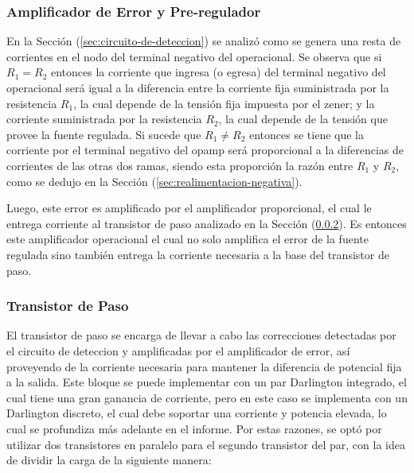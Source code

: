 \subsubsection{Amplificador de Error y Pre-regulador}

En la Sección (\ref{sec:circuito-de-deteccion}) se analizó como se genera una resta de corrientes en el nodo del terminal negativo del operacional. Se observa que si $R_1 = R_2$ entonces la corriente que ingresa (o egresa) del terminal negativo del operacional será igual a la diferencia entre la corriente fija suministrada por la resistencia $R_1$, la cual depende de la tensión fija impuesta por el zener; y la corriente suministrada por la resistencia $R_2$, la cual depende de la tensión que provee la fuente regulada. Si sucede que $R_1 \neq R_2$ entonces se tiene que la corriente por el terminal negativo del opamp será proporcional a la diferencias de corrientes de las otras dos ramas, siendo esta proporción la razón entre $R_1$ y $R_2$, como se dedujo en la Sección (\ref{sec:realimentacion-negativa}).

Luego, este error es amplificado por el amplificador proporcional, el cual le entrega corriente al transistor de paso analizado en la Sección (\ref{sec:transistor-de-paso}). Es entonces este amplificador operacional el cual no solo amplifica el error de la fuente regulada sino también entrega la corriente necesaria a la base del transistor de paso.

\subsubsection{Transistor de Paso}

\label{sec:transistor-de-paso}
El transistor de paso se encarga de llevar a cabo las correcciones detectadas por el circuito de deteccion y amplificadas por el amplificador de error, así proveyendo de la corriente necesaria para mantener la diferencia de potencial fija a la salida. Este bloque se puede implementar con un par Darlington integrado, el cual tiene una gran ganancia de corriente, pero en este caso se implementa con un Darlington discreto, el cual debe soportar una corriente y potencia elevada, lo cual se profundiza más adelante en el informe. Por estas razones, se optó por utilizar dos transistores en paralelo para el segundo transistor del par, con la idea de dividir la carga de la siguiente manera:

